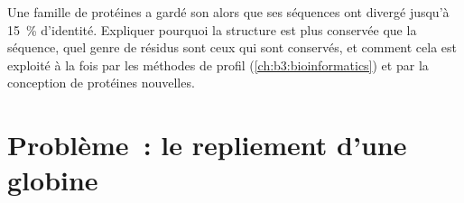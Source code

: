 \begin{exercise}[$\star\star\star$]\label{exo:b3:structural-biology:12}
Une famille de protéines a gardé son  alors que ses séquences
ont divergé jusqu'à \qty{15}{\%} d'identité. Expliquer pourquoi la
structure est plus conservée que la séquence, quel genre de résidus
sont ceux qui sont conservés, et comment cela est exploité à la fois
par les méthodes de profil (\cref{ch:b3:bioinformatics}) et par la
conception de protéines nouvelles.
\end{exercise}

\section{Problème~: le repliement d'une globine}

